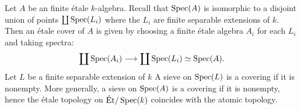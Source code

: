 \begin{example}
	Let $A$ be an finite \'etale $k$-algebra. Recall that $\operatorname{Spec}(A)$ is isomorphic to a disjoint union of points $\coprod \operatorname{Spec}(L_i)$ where the $L_i$ are finite separable extensions of $k$. Then an \'etale cover of $A$ is given by choosing a finite \'etale algebra $A_i$ for each $L_i$ and taking spectra:
	\[
		\coprod \operatorname{Spec}(A_i) \longrightarrow \coprod \operatorname{Spec}(L_i) \simeq \operatorname{Spec}(A).
	\]
	Let $L$ be a finite separable extension of $k$ A sieve on $\operatorname{Spec}(L)$ is a covering if it is nonempty. More generally, a sieve on $\operatorname{Spec}(A)$ is a covering if it is nonempty, hence the \'etale topology on $\text{\'Et}/\operatorname{Spec}(k)$ coincides with the atomic topology.
\end{example}

